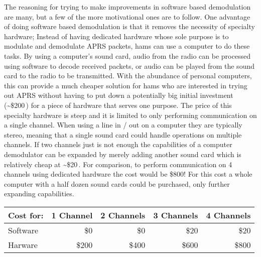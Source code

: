 The reasoning for trying to make improvements in software based demodulation are many, but a few of the more motivational ones are to follow. One advantage of doing software based demodulation is that it removes the necessity of specialty hardware; Instead of having dedicated hardware whose sole purpose is to modulate and demodulate APRS packets, hams can use a computer to do these tasks. By using a computer's sound card, audio from the radio can be processed using software to decode received packets, or audio can be played from the sound card to the radio to be transmitted. With the abundance of personal computers, this can provide a much cheaper solution for hams who are interested in trying out APRS without having to put down a potentially big initial investment (\textasciitilde\$200\,\cite{Kantronics2014,Outlet2014}) for a piece of hardware that serves one purpose. The price of this specialty hardware is steep and it is limited to only performing communication on a single channel. When using a line in / out on a computer they are typically stereo, meaning that a single sound card could handle operations on multiple channels. If two channels just is not enough the capabilities of a computer demodulator can be expanded by merely adding another sound card which is relatively cheap at \textasciitilde\$20\,\cite{Newegg}. For comparison, to perform communication on 4 channels using dedicated hardware the cost would be \$800! For this cost a whole computer with a half dozen sound cards could be purchased, only further expanding capabilities.
\begin{center}
	\begin{tabular}{ | l | r | r | r | r | }
	\hline
		Cost for: & 1 Channel & 2 Channels & 3 Channels & 4 Channels \\ \hline
		Software & \$0 & \$0 & \$20 & \$20 \\ \hline
		Harware & \$200 & \$400 & \$600 & \$800 \\
		\hline
	\end{tabular}
\end{center}

